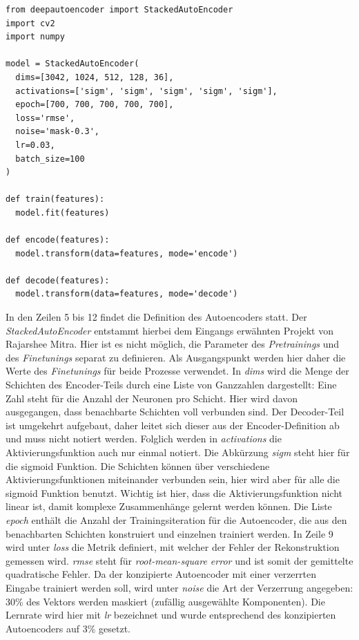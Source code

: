 \begin{lstlisting}[style=Python]
from deepautoencoder import StackedAutoEncoder
import cv2
import numpy

model = StackedAutoEncoder(
  dims=[3042, 1024, 512, 128, 36],
  activations=['sigm', 'sigm', 'sigm', 'sigm', 'sigm'], 
  epoch=[700, 700, 700, 700, 700], 
  loss='rmse', 
  noise='mask-0.3',
  lr=0.03, 
  batch_size=100
)

def train(features):
  model.fit(features)

def encode(features):
  model.transform(data=features, mode='encode')
  
def decode(features):
  model.transform(data=features, mode='decode')
\end{lstlisting}

In den Zeilen 5 bis 12 findet die Definition des Autoencoders statt. Der \textit{StackedAutoEncoder} entstammt hierbei dem Eingangs erwähnten Projekt von Rajarshee Mitra. Hier ist es nicht möglich, die Parameter des \textit{Pretrainings} und des \textit{Finetunings} separat zu definieren. Als Ausgangspunkt werden hier daher die Werte des \textit{Finetunings} für beide Prozesse verwendet. In \textit{dims} wird die Menge der Schichten des Encoder-Teils durch eine Liste von Ganzzahlen dargestellt: Eine Zahl steht für die Anzahl der Neuronen pro Schicht. Hier wird davon ausgegangen, dass benachbarte Schichten voll verbunden sind. Der Decoder-Teil ist umgekehrt aufgebaut, daher leitet sich dieser aus der Encoder-Definition ab und muss nicht notiert werden. Folglich werden in \textit{activations} die Aktivierungsfunktion auch nur einmal notiert. Die Abkürzung \textit{sigm} steht hier für die sigmoid Funktion. Die Schichten können über verschiedene Aktivierungsfunktionen miteinander verbunden sein, hier wird aber für alle die sigmoid Funktion benutzt. Wichtig ist hier, dass die Aktivierungsfunktion nicht linear ist, damit komplexe Zusammenhänge gelernt werden können. Die Liste \textit{epoch} enthält die Anzahl der Trainingsiteration für die Autoencoder, die aus den benachbarten Schichten konstruiert und einzelnen trainiert werden. In Zeile 9 wird unter \textit{loss} die Metrik definiert, mit welcher der Fehler der Rekonstruktion gemessen wird. \textit{rmse} steht für \textit{root-mean-square error} und ist somit der gemittelte quadratische Fehler. Da der konzipierte Autoencoder mit einer verzerrten Eingabe trainiert werden soll, wird unter \textit{noise} die Art der Verzerrung angegeben: 30\% des Vektors werden maskiert (zufällig ausgewählte Komponenten).
Die Lernrate wird hier mit \textit{lr} bezeichnet und wurde entsprechend des konzipierten Autoencoders auf 3\% gesetzt.\newline
